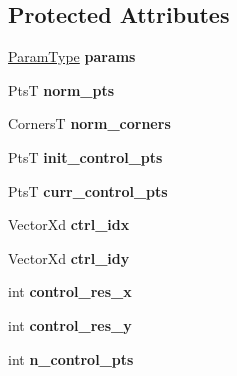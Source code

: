 \subsection*{Protected Attributes}
\begin{DoxyCompactItemize}
\item 
\hypertarget{classSpline_a232f442f0f017d2514e31c9ceab18bff}{\hyperlink{structSplineParams}{Param\-Type} {\bfseries params}}\label{classSpline_a232f442f0f017d2514e31c9ceab18bff}

\item 
\hypertarget{classSpline_ad4d65eed17fd5f1355b254b4be7aa408}{Pts\-T {\bfseries norm\-\_\-pts}}\label{classSpline_ad4d65eed17fd5f1355b254b4be7aa408}

\item 
\hypertarget{classSpline_a01b2bd9aba9f38c93e7c378a138136b4}{Corners\-T {\bfseries norm\-\_\-corners}}\label{classSpline_a01b2bd9aba9f38c93e7c378a138136b4}

\item 
\hypertarget{classSpline_a99f041d0d3fe11c5c21ce6e1af8bd652}{Pts\-T {\bfseries init\-\_\-control\-\_\-pts}}\label{classSpline_a99f041d0d3fe11c5c21ce6e1af8bd652}

\item 
\hypertarget{classSpline_a0c0c322174db8647716fa54679d502fd}{Pts\-T {\bfseries curr\-\_\-control\-\_\-pts}}\label{classSpline_a0c0c322174db8647716fa54679d502fd}

\item 
\hypertarget{classSpline_a7a415b5d6d8aa92355c18bcc1234cfc2}{Vector\-Xd {\bfseries ctrl\-\_\-idx}}\label{classSpline_a7a415b5d6d8aa92355c18bcc1234cfc2}

\item 
\hypertarget{classSpline_adc23cabb5466a33a1bfd714abb4a8fcd}{Vector\-Xd {\bfseries ctrl\-\_\-idy}}\label{classSpline_adc23cabb5466a33a1bfd714abb4a8fcd}

\item 
\hypertarget{classSpline_a59640fa21dd293cfc9bdf0176ac3af2b}{int {\bfseries control\-\_\-res\-\_\-x}}\label{classSpline_a59640fa21dd293cfc9bdf0176ac3af2b}

\item 
\hypertarget{classSpline_a30254c0cd097dafb998e9c006a70192e}{int {\bfseries control\-\_\-res\-\_\-y}}\label{classSpline_a30254c0cd097dafb998e9c006a70192e}

\item 
\hypertarget{classSpline_aa4e621da5bfed762a9927eefd9cb052e}{int {\bfseries n\-\_\-control\-\_\-pts}}\label{classSpline_aa4e621da5bfed762a9927eefd9cb052e}


\end{DoxyCompactItemize}
